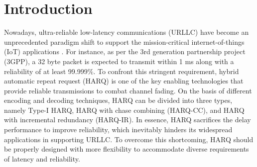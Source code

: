 \documentclass[conference]{IEEEtran}
\begin{document}
\IEEEpeerreviewmaketitle
\section{Introduction}\label{sec:intro}
\IEEEPARstart Nowadays, ultra-reliable low-latency communications (URLLC) have become an unprecedented paradigm shift to support the mission-critical internet-of-things (IoT) applications \cite{9826826}. For instance, as per the 3rd generation partnership project (3GPP), a 32 byte packet is expected to transmit within 1 ms along with a reliability of at least 99.999\%. To confront this stringent requirement, hybrid automatic repeat request (HARQ) is one of the key enabling technologies that provide reliable transmissions to combat channel fading. On the basis of different encoding and decoding techniques, HARQ can be divided into three types, namely Type-I HARQ, HARQ with chase combining (HARQ-CC), and HARQ with incremental redundancy (HARQ-IR). In essence, HARQ sacrifices the delay performance to improve reliability, which inevitably hinders its widespread applications in supporting URLLC. To overcome this shortcoming, HARQ should be properly designed with more flexibility to accommodate diverse requirements of latency and reliability.






\end{document}
